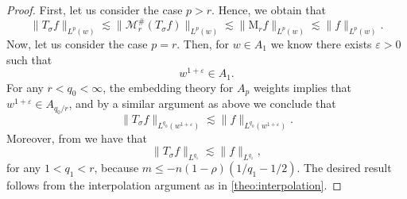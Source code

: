 \documentclass[12pt, reqno]{amsart}
\theoremstyle{definition}
\theoremstyle{remark}
\numberwithin{equation}{section}
\begin{document}
\begin{proof}
    First, let us consider the case $p>r$. Hence, we obtain that
    \begin{equation*}
        \|T_\sigma f\|_{L^p(w)} \lesssim\| \mathcal{M}^\#_r(T_\sigma f)\|_{L^p(w)} \lesssim\|\mathrm{M}_rf\|_{L^p(w)} \lesssim\|f\|_{L^p(w)}.
    \end{equation*}
    Now, let us consider the case $p=r$. Then, for $w\in A_1$ we know \cite[Corollary~7.6]{duoandikoetxea} there exists $\varepsilon>0$ such that 
    \begin{equation*}
        w^{1+\varepsilon} \in A_1.
    \end{equation*}
    For any $r<q_0<\infty$, the embedding theory for $A_p$ weights implies that $w^{1+\varepsilon}\in A_{q_0/r}$, and by a similar argument as above we conclude that 
    \begin{equation*}
        \|T_\sigma f\|_{L^{q_0}(w^{1+\varepsilon})} \lesssim\|f\|_{L^{q_0}(w^{1+\varepsilon})}.
    \end{equation*}
    Moreover, from \cite[Theorem~3.12]{Cardona:Martinez} we have that 
    \begin{equation*}
        \|T_\sigma f\|_{L^{q_1}} \lesssim\|f\|_{L^{q_1}},
    \end{equation*}
    for any $1<q_1<r$, because $m \leq -n(1-\rho)(1/q_1 - 1/2)$. The desired result follows from the interpolation argument as in \cref{theo:interpolation}.
\end{proof}
\end{document}
